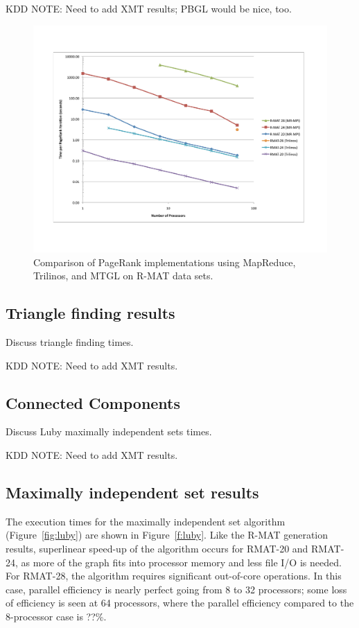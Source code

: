 KDD NOTE:  Need to add XMT results; PBGL would be nice, too.


\begin{figure}[h!]
\includegraphics[width=\textwidth]{fig_pagerank.pdf}
\caption{Comparison of PageRank implementations using MapReduce,
Trilinos, and MTGL on R-MAT data sets.}
\label{f:pr}
\end{figure}


\subsection{Triangle finding results}
Discuss triangle finding times.

KDD NOTE:  Need to add XMT results.

\subsection{Connected Components}
Discuss Luby maximally independent sets times.

KDD NOTE:  Need to add XMT results.

\subsection{Maximally independent set results}

The execution times for the maximally independent set algorithm
(Figure~\ref{fig:luby}) are shown in Figure~\ref{f:luby}.  Like the R-MAT
generation results, superlinear speed-up of the algorithm occurs for RMAT-20
and RMAT-24, as more of the graph fits into processor memory and less file
I/O is needed.  For RMAT-28, the algorithm requires significant out-of-core
operations. In this case, parallel efficiency is nearly perfect going from 
8 to 32 processors; some loss of efficiency is seen at 64 processors,
where the parallel efficiency compared to the 8-processor case is ??\%.

